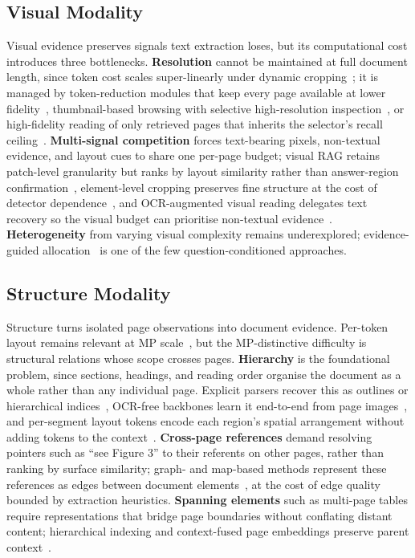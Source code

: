 \documentclass[11pt]{article}
\begin{document}
\subsection{Visual Modality}
\label{sec:modality-visual}
Visual evidence preserves signals text extraction loses, but its computational cost introduces three bottlenecks. \textbf{Resolution} cannot be maintained at full document length, since token cost scales super-linearly under dynamic cropping~\cite{zheng2026docvstar}; it is managed by token-reduction modules that keep every page available at lower fidelity~\cite{hu2025mplug2, yu2024texthawk2, jia2024leopard}, thumbnail-based browsing with selective high-resolution inspection~\cite{zheng2026docvstar, jain2025simpledoc}, or high-fidelity reading of only retrieved pages that inherits the selector's recall ceiling~\cite{zhu2026doclens, yan2025docseeker}. \textbf{Multi-signal competition} forces text-bearing pixels, non-textual evidence, and layout cues to share one per-page budget; visual RAG retains patch-level granularity but ranks by layout similarity rather than answer-region confirmation~\cite{cho2024m3docrag, tanaka2025vdocrag}, element-level cropping preserves fine structure at the cost of detector dependence~\cite{zhu2026doclens}, and OCR-augmented visual reading delegates text recovery so the visual budget can prioritise non-textual evidence~\cite{hannan2025docslm}. \textbf{Heterogeneity} from varying visual complexity remains underexplored; evidence-guided allocation~\cite{yan2025docseeker} is one of the few question-conditioned approaches.

\subsection{Structure Modality}
\label{sec:modality-structure}
Structure turns isolated page observations into document evidence. Per-token layout remains relevant at MP scale~\cite{zhu2025laytokenllm}, but the MP-distinctive difficulty is structural relations whose scope crosses pages. \textbf{Hierarchy} is the foundational problem, since sections, headings, and reading order organise the document as a whole rather than any individual page. Explicit parsers recover this as outlines or hierarchical indices~\cite{shin2025multidocfusion, sun2025docagent, fu2026dmap}, OCR-free backbones learn it end-to-end from page images~\cite{hu2025mplug2}, and per-segment layout tokens encode each region's spatial arrangement without adding tokens to the context~\cite{zhu2025laytokenllm}. \textbf{Cross-page references} demand resolving pointers such as ``see Figure 3'' to their referents on other pages, rather than ranking by surface similarity; graph- and map-based methods represent these references as edges between document elements~\cite{wu2025molorag, fu2026dmap}, at the cost of edge quality bounded by extraction heuristics. \textbf{Spanning elements} such as multi-page tables require representations that bridge page boundaries without conflating distant content; hierarchical indexing and context-fused page embeddings preserve parent context~\cite{gong2025mhier, qian2026accurate}.
\end{document}
